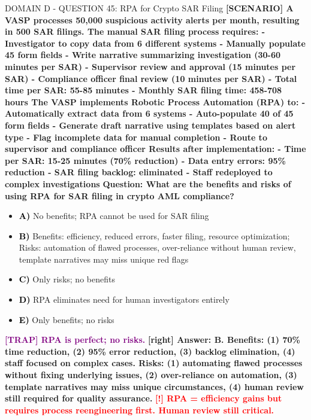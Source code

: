 \documentclass[11pt,a4paper]{beamer}
\newcommand{\redflag}[1]{\textcolor{red}{\textbf{[!] #1}}}
\newcommand{\trap}[1]{\textcolor{purple}{\textbf{[TRAP] #1}}}
\newcommand{\correct}[1]{\textcolor{green!50!black}{\textbf{[right] #1}}}
\newcommand{\scenario}[1]{\textcolor{blue!70!black}{\textbf{[SCENARIO] #1}}}
\newcommand{\option}[1]{\textcolor{black}{\textbf{#1}}}
\begin{document}
\begin{frame}{DOMAIN D - QUESTION 45: RPA for Crypto SAR Filing}
\scenario{A VASP processes 50,000 suspicious activity alerts per month, resulting in 500 SAR filings. The manual SAR filing process requires:
- Investigator to copy data from 6 different systems
- Manually populate 45 form fields
- Write narrative summarizing investigation (30-60 minutes per SAR)
- Supervisor review and approval (15 minutes per SAR)
- Compliance officer final review (10 minutes per SAR)
- Total time per SAR: 55-85 minutes
- Monthly SAR filing time: 458-708 hours
The VASP implements Robotic Process Automation (RPA) to:
- Automatically extract data from 6 systems
- Auto-populate 40 of 45 form fields
- Generate draft narrative using templates based on alert type
- Flag incomplete data for manual completion
- Route to supervisor and compliance officer
Results after implementation:
- Time per SAR: 15-25 minutes (70\% reduction)
- Data entry errors: 95\% reduction
- SAR filing backlog: eliminated
- Staff redeployed to complex investigations}
\vspace{0.2cm}
\textbf{Question: What are the benefits and risks of using RPA for SAR filing in crypto AML compliance?}
\vspace{0.1cm}
\begin{itemize}
    \item \option{A)} No benefits; RPA cannot be used for SAR filing
    \item \option{B)} Benefits: efficiency, reduced errors, faster filing, resource optimization; Risks: automation of flawed processes, over-reliance without human review, template narratives may miss unique red flags
    \item \option{C)} Only risks; no benefits
    \item \option{D)} RPA eliminates need for human investigators entirely
    \item \option{E)} Only benefits; no risks
\end{itemize}
\vspace{0.2cm}
\trap{RPA is perfect; no risks.}
\correct{Answer: B. Benefits: (1) 70\% time reduction, (2) 95\% error reduction, (3) backlog elimination, (4) staff focused on complex cases. Risks: (1) automating flawed processes without fixing underlying issues, (2) over-reliance on automation, (3) template narratives may miss unique circumstances, (4) human review still required for quality assurance.}
\redflag{RPA = efficiency gains but requires process reengineering first. Human review still critical.}
\end{frame}
\end{document}
